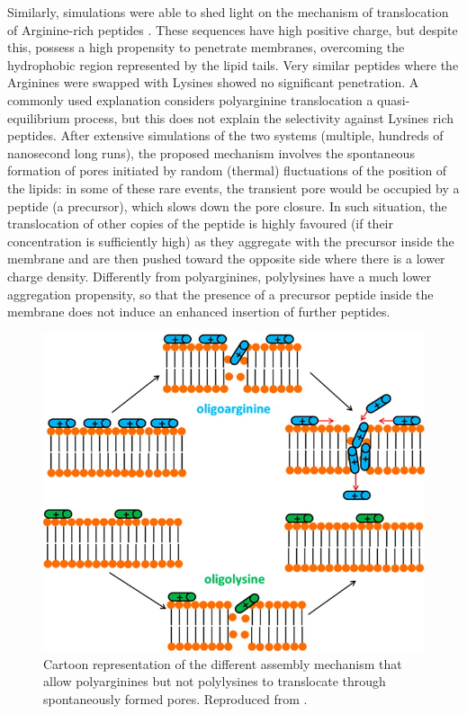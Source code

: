 Similarly, simulations were able to shed light on the mechanism of translocation of Arginine-rich peptides 
\citep{Sun2015}. These sequences have high positive charge, but despite this, possess a high propensity to penetrate membranes, overcoming the hydrophobic region represented by the lipid tails. Very similar peptides where the Arginines were swapped with Lysines showed no significant penetration.
%
A commonly used explanation considers polyarginine translocation a quasi-equilibrium process, but this does not explain the selectivity against Lysines rich peptides.
%
After extensive simulations of the two systems (multiple, hundreds of nanosecond long runs), the proposed mechanism involves the spontaneous formation of pores initiated by random (thermal) fluctuations of the position of the lipids: in some of these rare events, the transient pore would be occupied by a peptide (a precursor), which slows down the pore closure. In such situation, the translocation of other copies of the peptide is highly favoured (if their concentration is sufficiently high) as they aggregate with the precursor inside the membrane and are then pushed toward the opposite side where there is a lower charge density.
%
Differently from polyarginines, polylysines have a much lower aggregation propensity, so that the presence of a precursor peptide inside the membrane does not induce an enhanced insertion of further peptides.
%
\begin{figure}[t!]
\centering
\includegraphics[width=0.65\linewidth]{2methods/pics/polyarg.jpeg}
%
\caption[Polyarginine translocation]{Cartoon representation of the different assembly mechanism that allow polyarginines but not polylysines to translocate through spontaneously formed pores. Reproduced from \citet{Sun2015}.}
\label{fig:polyArg}
\end{figure}

